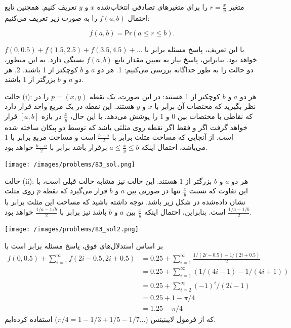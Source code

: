 \begin{solution}
  متغیر $ r = \frac{x}{y}$ را برای متغیرهای تصادفی انتخاب‌شده $ x $ و $ y $ تعریف کنیم. همچنین تابع احتمال $ f(a,b) $ را به صورت زیر تعریف می‌کنیم:

$$ f(a,b) = \mathsf{Pr}(a \leq r \leq b). $$

با این تعریف، پاسخ مسئله برابر با $ f(0,0.5) + f(1.5, 2.5) + f(3.5, 4.5) + \ldots $ خواهد بود. بنابراین، پاسخ نیاز به تعیین مقدار تابع $ f(a,b) $ بستگی دارد. به این منظور، دو حالت را به طور جداگانه بررسی می‌کنیم: 
1. هر دو $ a $ و $ b $ کوچکتر از 1 باشند.
2. هر دو $ a $ و $ b $ بزرگتر از 1 باشند.

حالت (i): هر دو $ a $ و $ b $ کوچکتر از 1 هستند: در این صورت، یک نقطه $ p = (x, y) $ را در نظر بگیرید که مختصات آن برابر با $ x $ و $ y $ هستند. این نقطه در یک مربع واحد قرار دارد که نقاطی با مختصات بین 0 و 1 را پوشش می‌دهد. با این حال، $ \frac{x}{y} $ در بازه $ [a, b] $ قرار خواهد گرفت اگر و فقط اگر نقطه روی مثلثی باشد که توسط دو پیکان ساخته شده است. از آنجایی که مساحت مثلث برابر با $ \frac{b-a}{2} $ است و مساحت مربع برابر با 1 می‌باشد، احتمال اینکه $ a \leq \frac{x}{y} \leq b $ برقرار باشد برابر با $ \frac{b-a}{2} $ خواهد بود.

\begin{center}
\texttt{[image: /images/problems/83\_sol.png]}
\end{center}
حالت (ii): هر دو $ a $ و $ b $ بزرگتر از 1 هستند. این حالت نیز مشابه حالت قبلی است، با این تفاوت که نسبت $ \frac{x}{y} $ تنها در صورتی بین $ a $ و $ b $ قرار می‌گیرد که نقطه $ p $ روی مثلث نشان داده‌شده در شکل زیر باشد. توجه داشته باشید که مساحت این مثلث برابر با $ \frac{1/a - 1/b}{2} $ است. بنابراین، احتمال اینکه $ \frac{x}{y} $ بین $ a $ و $ b $ باشد نیز برابر با $ \frac{1/a - 1/b}{2} $ خواهد بود.
\begin{center}
\texttt{[image: /images/problems/83\_sol2.png]}
\end{center}
بر اساس استدلال‌های فوق، پاسخ مسئله برابر است با 
\begin{align}
f(0,0.5) + \sum_{i=1}^{\infty} f(2i-0.5, 2i+0.5)  &= 0.25 + \sum_{i=1}^{\infty}  \frac{1/(2i-0.5) - 1/(2i+0.5)}{2} \nonumber  \\
& = 0.25 + \sum_{i=1}^{\infty}  (1/(4i-1) - 1/(4i+1)) \nonumber \\
& = 0.25 + \sum_{i=2}^{\infty}  (-1)^i/(2i-1) \nonumber  \\
& = 0.25 + 1-\pi/4 \label{eq:one}\\
& = 1.25-\pi/4 \nonumber
\end{align}
 که از فرمول لایبنیتس ($ \pi/4 = 1 - 1/3 + 1/5 - 1/7 \ldots $) استفاده کرده‌ایم.
\end{solution}
